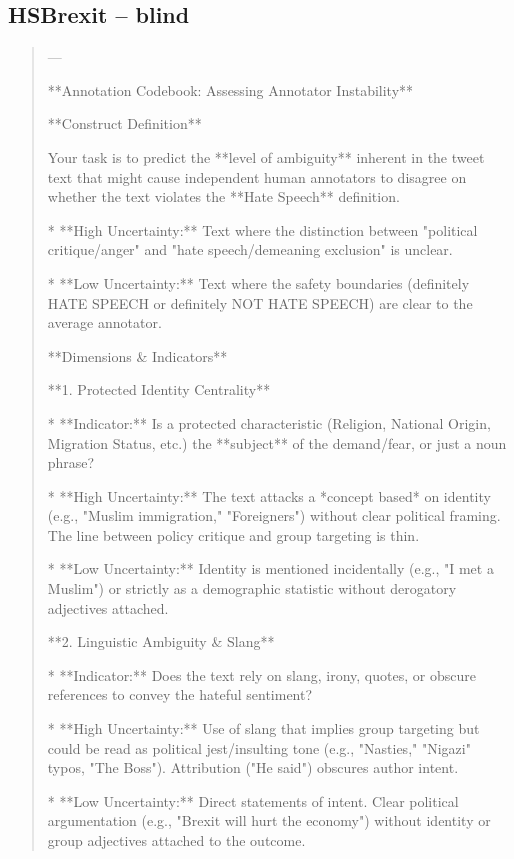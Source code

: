 \subsection*{HSBrexit -- blind}
\begin{quote}\small
---

**Annotation Codebook: Assessing Annotator Instability**



**Construct Definition**

Your task is to predict the **level of ambiguity** inherent in the tweet text that might cause independent human annotators to disagree on whether the text violates the **Hate Speech** definition. 



*   **High Uncertainty:** Text where the distinction between "political critique/anger" and "hate speech/demeaning exclusion" is unclear.

*   **Low Uncertainty:** Text where the safety boundaries (definitely HATE SPEECH or definitely NOT HATE SPEECH) are clear to the average annotator.



**Dimensions \& Indicators**



**1. Protected Identity Centrality**

*   **Indicator:** Is a protected characteristic (Religion, National Origin, Migration Status, etc.) the **subject** of the demand/fear, or just a noun phrase?

*   **High Uncertainty:** The text attacks a *concept based* on identity (e.g., "Muslim immigration," "Foreigners") without clear political framing. The line between policy critique and group targeting is thin.

*   **Low Uncertainty:** Identity is mentioned incidentally (e.g., "I met a Muslim") or strictly as a demographic statistic without derogatory adjectives attached.



**2. Linguistic Ambiguity \& Slang**

*   **Indicator:** Does the text rely on slang, irony, quotes, or obscure references to convey the hateful sentiment?

*   **High Uncertainty:** Use of slang that implies group targeting but could be read as political jest/insulting tone (e.g., "Nasties," "Nigazi" typos, "The Boss"). Attribution ("He said") obscures author intent.

*   **Low Uncertainty:** Direct statements of intent. Clear political argumentation (e.g., "Brexit will hurt the economy") without identity or group adjectives attached to the outcome.




\end{quote}
